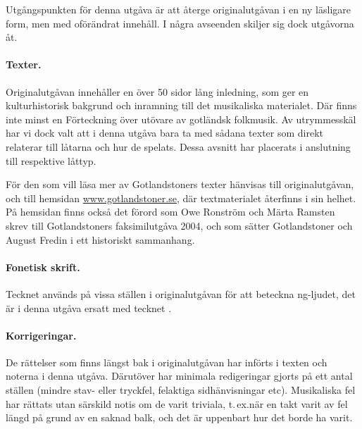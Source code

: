 {\makeatother

Utgångspunkten för denna utgåva är att återge originalutgåvan i en ny läsligare
form, men med oförändrat innehåll. I några avseenden skiljer sig dock utgåvorna åt.

\paragraph{Texter.} Originalutgåvan innehåller en över 50 sidor lång inledning,
som ger en kulturhistorisk bakgrund och inramning till det musikaliska materialet.
Där finns inte minst en \guillemotright{}Förteckning över utövare av gotländsk
folkmusik\guillemotright{}.
Av utrymmesskäl har vi dock valt att i denna utgåva bara ta med sådana texter
som direkt relaterar till låtarna och hur de spelats. Dessa avsnitt
har placerats i anslutning till respektive låttyp.

För den som vill läsa mer av Gotlandstoners texter hänvisas till originalutgåvan,
och till hemsidan \href{http://www.gotlandstoner.se/}{www.gotlandstoner.se}, där textmaterialet återfinns i sin helhet.
På hemsidan finns också det förord som Owe Ronström och
Märta Ramsten skrev till Gotlandstoners faksimilutgåva 2004, och som
sätter Gotlandstoner och August Fredin i ett historiskt sammanhang.

\paragraph{Fonetisk skrift.} Tecknet  används
på vissa ställen i originalutgåvan för att beteckna ng-ljudet, det är i denna utgåva ersatt med tecknet \ng{}.

\paragraph{Korrigeringar.} De rättelser som finns längst bak i originalutgåvan har
införts i texten och noterna i denna utgåva. Därutöver har minimala redigeringar
gjorts på ett antal ställen (mindre stav- eller tryckfel, felaktiga sidhänvisningar etc).
\guillemotright{}Musikaliska fel\guillemotright{} har rättats utan särskild notis
om de varit \guillemotright{}triviala\guillemotright{}, t.\,ex.\@ när en takt
varit av fel längd på grund av en saknad balk, och det är uppenbart hur det borde ha varit.

}
